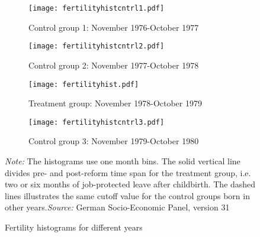 \documentclass[a4paper ]{article}
\begin{document}


\begin{landscape} 

\begin{figure}[p]\vspace*{-2cm}
\centering
\begin{subfigure}[h]{0.7\textwidth}\centering
	\caption{Control group 1: November 1976-October 1977}
	\texttt{[image: fertilityhistcntrl1.pdf]}
\end{subfigure}
\quad
\begin{subfigure}[h]{0.7\textwidth}\centering
	\caption{Control group 2: November 1977-October 1978}
	\texttt{[image: fertilityhistcntrl2.pdf]}
\end{subfigure}

\begin{subfigure}[h]{0.7\textwidth}\centering
	\caption{Treatment group: November 1978-October 1979}
	\texttt{[image: fertilityhist.pdf]}
\end{subfigure}
\quad
\begin{subfigure}[h]{0.7\textwidth}\centering
	\caption{Control group 3: November 1979-October 1980}
	\texttt{[image: fertilityhistcntrl3.pdf]}
\end{subfigure}

\begin{adjustwidth}{2cm}{}
\caption{Fertility histograms for different years}\label{fig:appdx_hist}
\begin{minipage}{1.35\textwidth} %
{\footnotesize \textit{Note:} The histograms use one month bins. The solid vertical line divides pre- and post-reform time span for the treatment group, i.e. two or six months of job-protected leave after childbirth. The dashed lines illustrates the same cutoff value for the control groups born in other years.\newline \textit{Source: }German Socio-Economic Panel, version 31\par}
\end{minipage}
\end{adjustwidth}

\end{figure}

\end{landscape}
\end{document}
